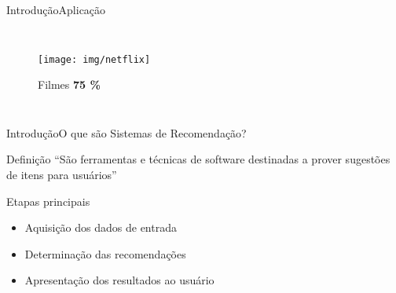 \begin{frame}{Introdução}{Aplicação}
\begin{columns}[b]
\begin{figure}[ht]
    \begin{center}
    \texttt{[image: img/netflix]}

    Filmes \textbf{75 \%} \\
    \cite{netflix75}
    \end{center}
\end{figure}
\end{columns}
\end{frame}




\begin{frame}{Introdução}{O que são Sistemas de Recomendação?}
\begin{block}{Definição}
``São ferramentas e técnicas de software destinadas a prover sugestões de itens para usuários'' \cite{ricci2011introduction-chap1}
\end{block}

\begin{block}{Etapas principais}
\begin{itemize}
    \item Aquisição dos dados de entrada
    \item Determinação das recomendações
    \item Apresentação dos resultados ao usuário
\end{itemize}
\end{block}
\end{frame}